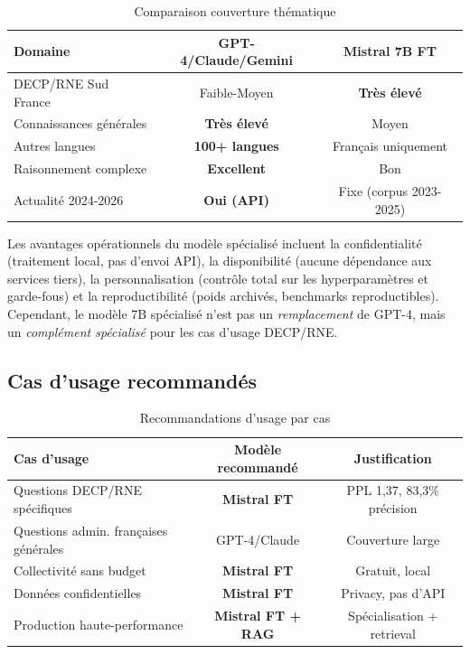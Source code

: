 \begin{table}[h]
\centering
\caption{Comparaison couverture thématique}
\label{tab:coverage_comparison}
\begin{tabular}{@{}lcc@{}}
\toprule
\textbf{Domaine} & \textbf{GPT-4/Claude/Gemini} & \textbf{Mistral 7B FT} \\ \midrule
DECP/RNE Sud France & Faible-Moyen & \textbf{Très élevé} \\
Connaissances générales & \textbf{Très élevé} & Moyen \\
Autres langues & \textbf{100+ langues} & Français uniquement \\
Raisonnement complexe & \textbf{Excellent} & Bon \\
Actualité 2024-2026 & \textbf{Oui (API)} & Fixe (corpus 2023-2025) \\
\bottomrule
\end{tabular}
\end{table}

Les avantages opérationnels du modèle spécialisé incluent la confidentialité (traitement local, pas d'envoi API), la disponibilité (aucune dépendance aux services tiers), la personnalisation (contrôle total sur les hyperparamètres et garde-fous) et la reproductibilité (poids archivés, benchmarks reproductibles). Cependant, le modèle 7B spécialisé n'est pas un \textit{remplacement} de GPT-4, mais un \textit{complément spécialisé} pour les cas d'usage DECP/RNE.

\subsection{Cas d'usage recommandés}

\begin{table}[h]
\centering
\caption{Recommandations d'usage par cas}
\label{tab:use_case_recommendations}
\small
\begin{tabular}{@{}lcc@{}}
\toprule
\textbf{Cas d'usage} & \textbf{Modèle recommandé} & \textbf{Justification} \\ \midrule
Questions DECP/RNE spécifiques & \textbf{Mistral FT} & PPL 1,37, 83,3\% précision \\
Questions admin. françaises générales & GPT-4/Claude & Couverture large \\
Collectivité sans budget & \textbf{Mistral FT} & Gratuit, local \\
Données confidentielles & \textbf{Mistral FT} & Privacy, pas d'API \\
Production haute-performance & \textbf{Mistral FT + RAG} & Spécialisation + retrieval \\
\bottomrule
\end{tabular}
\end{table}


